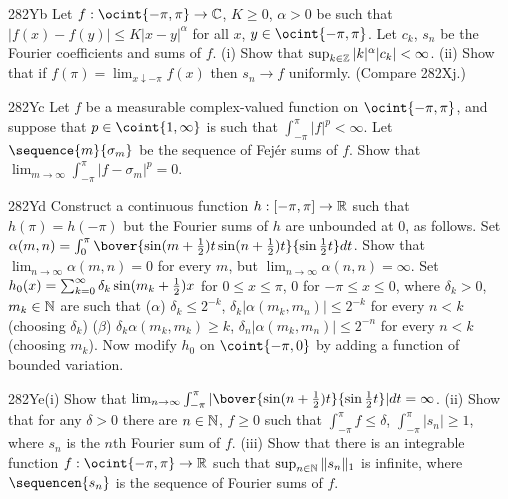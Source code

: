 {\spheader 282Yb Let $f:\ocint{-\pi,\pi}\to\Bbb C$, $K\ge 0$, $\alpha>0$
be such that $|f(x)-f(y)|\le K|x-y|^{\alpha}$ for all $x$,
$y\in\ocint{-\pi,\pi}$.   Let $c_k$, $s_n$ be the Fourier coefficients
and sums of $f$.   (i) Show that
$\sup_{k\in\Bbb Z}|k|^{\alpha}|c_k|<\infty$.      (ii) Show that if $f(\pi)=\lim_{x\downarrow-\pi}f(x)$
then $s_n\to f$ uniformly.   (Compare 282Xj.)

\spheader 282Yc Let $f$ be a measurable
complex-valued function on $\ocint{-\pi,\pi}$, and suppose that
$p\in\coint{1,\infty}$ is such that
$\int_{-\pi}^{\pi}|f|^p<\infty$.   Let
$\sequence{m}{\sigma_m}$ be the sequence of Fej\'er sums of $f$.   Show
that $\lim_{m\to\infty}\int_{-\pi}^{\pi}|f-\sigma_m|^p=0$.

\spheader 282Yd Construct a continuous function
$h:[-\pi,\pi]\to\Bbb R$ such that $h(\pi)=h(-\pi)$ but the Fourier sums
of $h$ are unbounded at $0$, as follows.   Set
$\alpha(m,n)=\int_0^{\pi}
\bover{\sin(m+{1\over2})t\sin(n+{1\over 2})t}{\sin{1\over 2}t}dt$.
Show that $\lim_{n\to\infty}\alpha(m,n)=0$
for every $m$, but $\lim_{n\to\infty}\alpha(n,n)=\infty$.   Set
$h_0(x)=\sum_{k=0}^{\infty}\delta_k\sin(m_k+{1\over 2})x$ for
$0\le x\le\pi$, $0$ for $-\pi\le x\le 0$, where
$\delta_k>0$, $m_k\in\Bbb N$ are such that
($\alpha$) $\delta_k\le 2^{-k}$, $\delta_k|\alpha(m_k,m_n)|\le 2^{-k}$
for every $n<k$ (choosing $\delta_k$) ($\beta$)
$\delta_k\alpha(m_k,m_k)\ge k$, $\delta_n|\alpha(m_k,m_n)|\le 2^{-n}$
for every $n<k$ (choosing
$m_k$).   Now modify $h_0$ on $\coint{-\pi,0}$ by adding a function of
bounded variation.

\spheader 282Ye(i) Show that $\lim_{n\to\infty}\int_{-\pi}^{\pi}
|\bover{\sin(n+{1\over2})t}{\sin{1\over 2}t}|dt=\infty$.  
(ii) Show that for any $\delta>0$ there are $n\in\Bbb N$, $f\ge 0$ such
that $\int_{-\pi}^{\pi}f\le\delta$, $\int_{-\pi}^{\pi}|s_n|\ge 1$, where
$s_n$ is the $n$th Fourier sum of $f$.      (iii) Show that there is an integrable function
$f:\ocint{-\pi,\pi}\to\Bbb R$ such that $\sup_{n\in\Bbb N}\|s_n\|_1$ is
infinite, where $\sequencen{s_n}$ is the sequence of Fourier sums of
$f$.   

}

